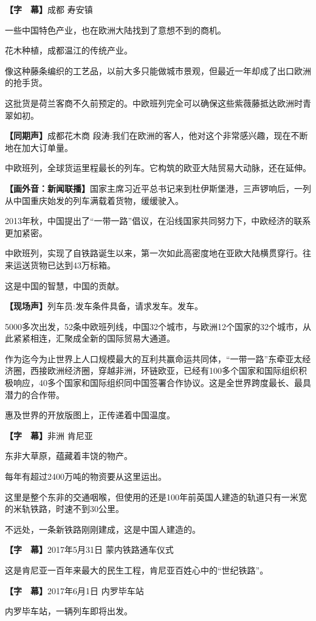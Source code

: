 \documentclass{ctexart}
\newcommand{\zkh}[1]{\textbf{\hspace{-2.7em} 【#1】}}
\begin{document}
\zkh{字　幕}成都 寿安镇

一些中国特色产业，也在欧洲大陆找到了意想不到的商机。

花木种植，成都温江的传统产业。

像这种藤条编织的工艺品，以前大多只能做城市景观，但最近一年却成了出口欧洲的抢手货。

这批货是荷兰客商不久前预定的。中欧班列完全可以确保这些紫薇藤抵达欧洲时青翠如初。

\zkh{同期声}成都花木商 段涛:我们在欧洲的客人，他对这个非常感兴趣，现在不断地在加大订单量。

中欧班列，全球货运里程最长的列车。它构筑的欧亚大陆贸易大动脉，还在延伸。

\zkh{画外音：新闻联播}国家主席习近平总书记来到杜伊斯堡港，三声锣响后，一列从中国重庆始发的列车满载着货物，缓缓驶入。

2013年秋，中国提出了``一带一路''倡议，在沿线国家共同努力下，中欧经济的联系更加紧密。

中欧班列，实现了自铁路诞生以来，第一次如此高密度地在亚欧大陆横贯穿行。往来运送货物已达到43万标箱。

这是中国的智慧，中国的贡献。

\zkh{现场声}列车员:发车条件具备，请求发车。发车。

5000多次出发，52条中欧班列线，中国32个城市，与欧洲12个国家的32个城市，从此紧紧相连，汇聚成全新的国际贸易大通道。

作为迄今为止世界上人口规模最大的互利共赢命运共同体，``一带一路''东牵亚太经济圈，西接欧洲经济圈，穿越非洲，环链欧亚，已经有100多个国家和国际组织积极响应，40多个国家和国际组织同中国签署合作协议。这是全世界跨度最长、最具潜力的合作带。

惠及世界的开放版图上，正传递着中国温度。

\zkh{字　幕}非洲 肯尼亚

东非大草原，蕴藏着丰饶的物产。

每年有超过2400万吨的物资要从这里运出。

这里是整个东非的交通咽喉，但使用的还是100年前英国人建造的轨道只有一米宽的米轨铁路，时速不到30公里。

不远处，一条新铁路刚刚建成，这是中国人建造的。

\zkh{字　幕}2017年5月31日 蒙内铁路通车仪式

这是肯尼亚一百年来最大的民生工程，肯尼亚百姓心中的``世纪铁路''。

\zkh{字　幕}2017年6月1日 内罗毕车站

内罗毕车站，一辆列车即将出发。
\end{document}
